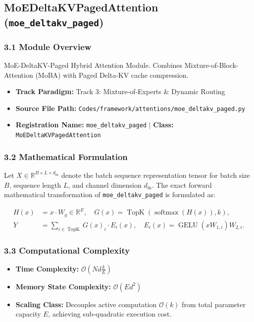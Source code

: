 \subsection{MoEDeltaKVPagedAttention (\texttt{moe\_deltakv\_paged})}
\label{sec:app_module_moe_deltakv_paged}

\subsubsection*{3.1 Module Overview}
MoE-DeltaKV-Paged Hybrid Attention Module. Combines Mixture-of-Block-Attention (MoBA) with Paged Delta-KV cache compression.
\begin{itemize}
    \item \textbf{Track Paradigm:} Track 3: Mixture-of-Experts \& Dynamic Routing
    \item \textbf{Source File Path:} \texttt{Codes/framework/attentions/moe\_deltakv\_paged.py}
    \item \textbf{Registration Name:} \texttt{moe\_deltakv\_paged} $\mid$ \textbf{Class:} \texttt{MoEDeltaKVPagedAttention}
\end{itemize}

\subsubsection*{3.2 Mathematical Formulation}
Let $X \in \mathbb{R}^{B \times L \times d_{\text{in}}}$ denote the batch sequence representation tensor for batch size $B$, sequence length $L$, and channel dimension $d_{\text{in}}$. The exact forward mathematical transformation of \texttt{moe\_deltakv\_paged} is formulated as:

\begin{align}
H(x) &= x \cdot W_g \in \mathbb{R}^{E}, \quad G(x) = \operatorname{TopK}\left(\operatorname{softmax}(H(x)), k\right), \\
Y &= \sum_{i \in \operatorname{TopK}} G(x)_i \cdot E_i(x), \quad E_i(x) = \operatorname{GELU}(x W_{1, i}) W_{2, i}.
\end{align}


\subsubsection*{3.3 Computational Complexity}
\begin{itemize}
    \item \textbf{Time Complexity:} $\mathcal{O}(N d \frac{k}{E})$
    \item \textbf{Memory State Complexity:} $\mathcal{O}(E d^2)$
    \item \textbf{Scaling Class:} Decouples active computation $\mathcal{O}(k)$ from total parameter capacity $E$, achieving sub-quadratic execution cost.
\end{itemize}

